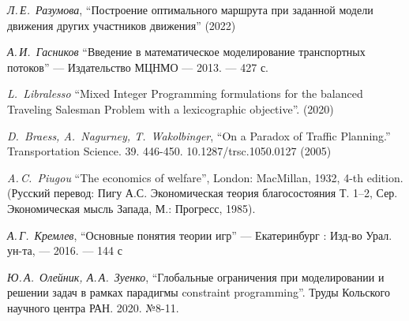 \documentclass[12pt, a4paper]{article}
\begin{document}
    \newpage
\begin{thebibliography}{0}
	
	
	 \textit{Л.\,Е.~Разумова}, ``Построение оптимального маршрута при заданной модели движения других участников движения'' (2022)
	
	 \textit{А.\,И.~Гасников} ``Введение в математическое моделирование транспортных потоков'' --- Издательство МЦНМО --- 2013. --- 427 с.
	
	 \textit{L.~Libralesso} ``Mixed Integer Programming formulations for the balanced Traveling Salesman Problem with a lexicographic objective''. (2020)
	
	 \textit{D.~Braess, A.~Nagurney, T.~Wakolbinger}, ``On a Paradox of Traffic Planning.'' Transportation Science. 39. 446-450. 10.1287/trsc.1050.0127 (2005)
	
	 \textit{A.\,C.~Piugou} ``The economics of welfare'', London: MacMillan, 1932,
	4-th edition. (Русский перевод: Пигу А.С. Экономическая теория благосостояния Т. 1–2, Сер. Экономическая мысль Запада,
	М.: Прогресс, 1985).
	
	 \textit{А.\,Г.~Кремлев}, ``Основные понятия теории игр'' --- Екатеринбург : Изд-во Урал. ун-та, --- 2016. --- 144 с
	
	 \textit{Ю.\,А.~Олейник, А.\,А.~Зуенко}, ``Глобальные ограничения при моделировании и решении задач в рамках парадигмы constraint programming''. Труды Кольского научного центра РАН. 2020. №8-11.
	
\end{thebibliography} 
\end{document}
